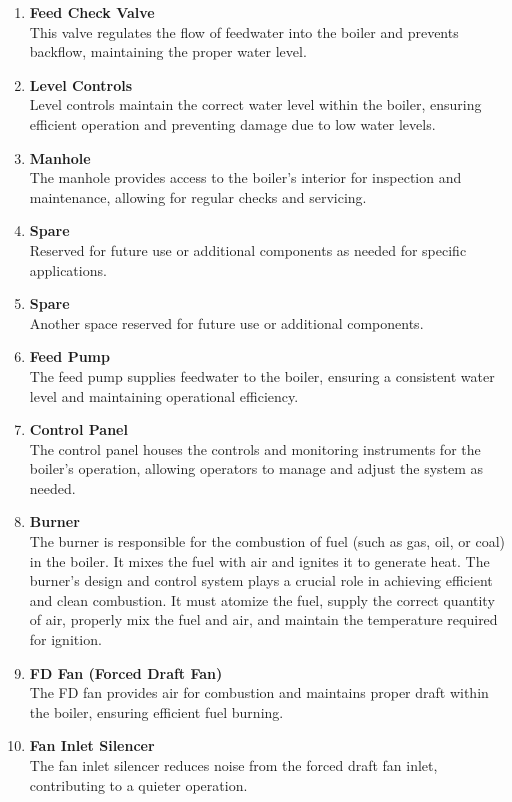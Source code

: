 \begin{enumerate}
    \item \textbf{Feed Check Valve}\\
    This valve regulates the flow of feedwater into the boiler and prevents backflow, maintaining the proper water level.

    \item \textbf{Level Controls}\\
    Level controls maintain the correct water level within the boiler, ensuring efficient operation and preventing damage due to low water levels.

    \item \textbf{Manhole}\\
    The manhole provides access to the boiler's interior for inspection and maintenance, allowing for regular checks and servicing.

    \item \textbf{Spare}\\
    Reserved for future use or additional components as needed for specific applications.

    \item \textbf{Spare}\\
    Another space reserved for future use or additional components.

    \item \textbf{Feed Pump}\\
    The feed pump supplies feedwater to the boiler, ensuring a consistent water level and maintaining operational efficiency.

    \item \textbf{Control Panel}\\
    The control panel houses the controls and monitoring instruments for the boiler's operation, allowing operators to manage and adjust the system as needed.

    \item \textbf{Burner}\\
    The burner is responsible for the combustion of fuel (such as gas, oil, or coal) in the boiler. It mixes the fuel with air and ignites it to generate heat. The burner's design and control system plays a crucial role in achieving efficient and clean combustion. It must atomize the fuel, supply the correct quantity of air, properly mix the fuel and air, and maintain the temperature required for ignition.

    \item \textbf{FD Fan (Forced Draft Fan)}\\
    The FD fan provides air for combustion and maintains proper draft within the boiler, ensuring efficient fuel burning.

    \item \textbf{Fan Inlet Silencer}\\
    The fan inlet silencer reduces noise from the forced draft fan inlet, contributing to a quieter operation.
\end{enumerate}

